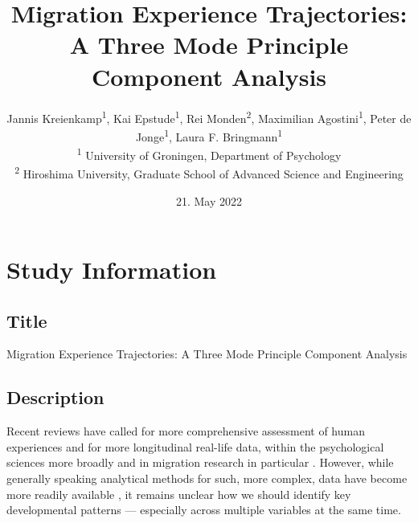 \documentclass[]{article}
\title{Migration Experience Trajectories: A Three Mode Principle
Component Analysis}
\author{
          Jannis Kreienkamp\textsuperscript{1},
          Kai Epstude\textsuperscript{1},
          Rei Monden\textsuperscript{2},
          Maximilian Agostini\textsuperscript{1},
          Peter de Jonge\textsuperscript{1},
          Laura F.
Bringmann\textsuperscript{1}          \\ \vspace{0.5cm}
              \textsuperscript{1} University of Groningen, Department of
Psychology\\
              \textsuperscript{2} Hiroshima University, Graduate School
of Advanced Science and Engineering      }
\date{21. May 2022}
\newcounter{question}
\begin{document}
\maketitle
\vspace{2pc}


\newcommand\Question[2]{%
   \leavevmode\par
   \stepcounter{question}
   \noindent
   \textbf{\thequestion. #1}. #2\par}

\newcommand\Answer[1]{%
    \noindent
    \textit{Registered response}: #1\par}

\newlength{\mylength}
\setlength{\fboxsep}{15pt}
\setlength{\mylength}{\linewidth}
\addtolength{\mylength}{-2\fboxsep}
\addtolength{\mylength}{-2\fboxrule}

\hypertarget{study-information}{%
\section{Study Information}\label{study-information}}

\hypertarget{title}{%
\subsection{Title}\label{title}}

Migration Experience Trajectories: A Three Mode Principle Component
Analysis

\hypertarget{description}{%
\subsection{Description}\label{description}}

Recent reviews have called for more comprehensive assessment of human
experiences and for more longitudinal real-life data, within the
psychological sciences more broadly and in migration research in
particular
\citep[e.g.,][]{Kreienkamp2022d, MacInnis2015, McKeown2017, Pettigrew2011, Ward2019}.
However, while generally speaking analytical methods for such, more
complex, data have become more readily available
\citep[e.g.,][]{ODonnell2021}, it remains unclear how we should identify
key developmental patterns --- especially across multiple variables at
the same time.
\end{document}
